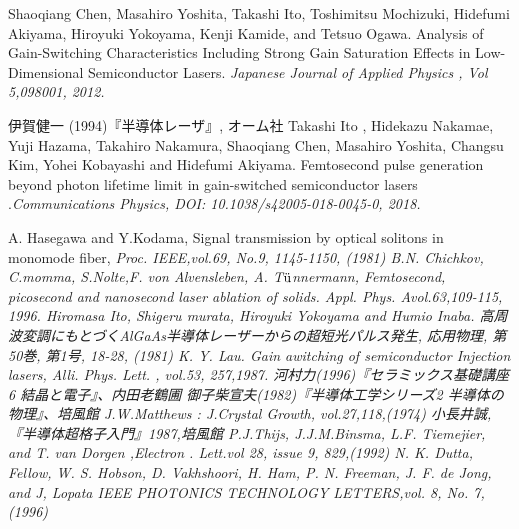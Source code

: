 \begin{thebibliography}{99}
 Shaoqiang Chen, Masahiro Yoshita, Takashi Ito, Toshimitsu Mochizuki, Hidefumi Akiyama, Hiroyuki Yokoyama, Kenji Kamide, and Tetsuo Ogawa. Analysis of Gain-Switching Characteristics Including Strong Gain Saturation Effects in Low-Dimensional Semiconductor Lasers. \sl Japanese Journal of Applied  Physics \rm , Vol 5,098001, 2012.

 伊賀健一 (1994)『半導体レーザ』, オーム社
Takashi Ito
, Hidekazu Nakamae, Yuji Hazama, Takahiro Nakamura, Shaoqiang Chen, Masahiro Yoshita, Changsu Kim, Yohei Kobayashi and Hidefumi Akiyama.
Femtosecond pulse generation beyond photon lifetime limit in gain-switched semiconductor lasers .\sl Communications Physics\rm , DOI: 10.1038/s42005-018-0045-0, 2018. 

 A. Hasegawa and Y.Kodama, Signal transmission by optical solitons in monomode fiber, \sl Proc. IEEE\rm ,vol.69, No.9, 1145-1150, (1981)
 B.N. Chichkov, C.momma, S.Nolte,F. von Alvensleben, A. T$\rm{\ddot{u}}$nnermann, Femtosecond, picosecond and nanosecond laser ablation of solids. \sl Appl. Phys. A\rm vol.63,109-115, 1996.
 Hiromasa Ito, Shigeru 
murata, Hiroyuki Yokoyama and Humio Inaba. 高周波変調にもとづくAlGaAs半導体レーザーからの超短光パルス発生, 応用物理, 第50巻, 第1号, 18-28, (1981)
 K. Y. Lau. Gain awitching of semiconductor Injection lasers, \sl Alli. Phys. Lett. \rm , vol.53, 257,1987.
河村力(1996)『セラミックス基礎講座6 結晶と電子』、内田老鶴圃
御子柴宣夫(1982)『半導体工学シリーズ2 半導体の物理』、培風館
 J.W.Matthews : J.Crystal Growth, vol.27,118,(1974)
小長井誠,『半導体超格子入門』1987,培風館
 P.J.Thijs, J.J.M.Binsma, L.F. Tiemejier, and T. van Dorgen ,\sl Electron . Lett.\rm vol 28, issue 9, 829,(1992)
N. K. Dutta, Fellow, W. S. Hobson, D. Vakhshoori, H. Ham, P. N. Freeman, J. F. de Jong, and J, Lopata \sl IEEE PHOTONICS TECHNOLOGY LETTERS\rm ,vol. 8, No. 7, (1996)
\end{thebibliography}
